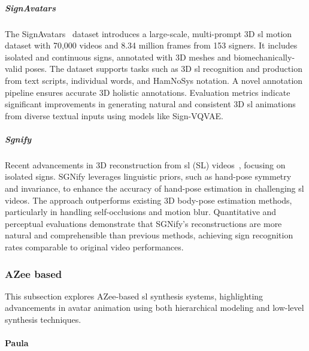 \documentclass[../../main.tex]{subfiles}
\begin{document}
\subparagraph{SignAvatars}
\label{ch:background_work:sign_language_synthesis:3d_techniques:sign_language_synthesis_systems:synthesis_based_on_generative_models:signavatars}

The SignAvatars~\cite{yu2023signavatars} dataset introduces a large-scale, multi-prompt 3D \gls{sl} motion dataset with 70,000 videos and 8.34 million frames from 153 signers. It includes isolated and continuous signs, annotated with 3D meshes and biomechanically-valid poses. The dataset supports tasks such as 3D \gls{sl} recognition and production from text scripts, individual words, and HamNoSys notation. A novel annotation pipeline ensures accurate 3D holistic annotations. Evaluation metrics indicate significant improvements in generating natural and consistent 3D \gls{sl} animations from diverse textual inputs using models like Sign-VQVAE.

\subparagraph{Sgnify}
\label{ch:background_work:sign_language_synthesis:3d_techniques:sign_language_synthesis_systems:synthesis_based_on_generative_models:sgnify}

Recent advancements in 3D reconstruction from \gls{sl} (SL) videos~\cite{Forte_2023_CVPR}, focusing on isolated signs. SGNify leverages linguistic priors, such as hand-pose symmetry and invariance, to enhance the accuracy of hand-pose estimation in challenging \gls{sl} videos. The approach outperforms existing 3D body-pose estimation methods, particularly in handling self-occlusions and motion blur. Quantitative and perceptual evaluations demonstrate that SGNify's reconstructions are more natural and comprehensible than previous methods, achieving sign recognition rates comparable to original video performances.

\subsubsection{AZee based}
\label{ch:background_work:sign_language_synthesis:3d_techniques:sign_language_synthesis_systems:azee_based}

This subsection explores AZee-based \gls{sl} synthesis systems, highlighting advancements in avatar animation using both hierarchical modeling and low-level synthesis techniques.

\paragraph{Paula}
\label{ch:background_work:sign_language_synthesis:3d_techniques:sign_language_synthesis_systems:azee_based:paula}
\end{document}

